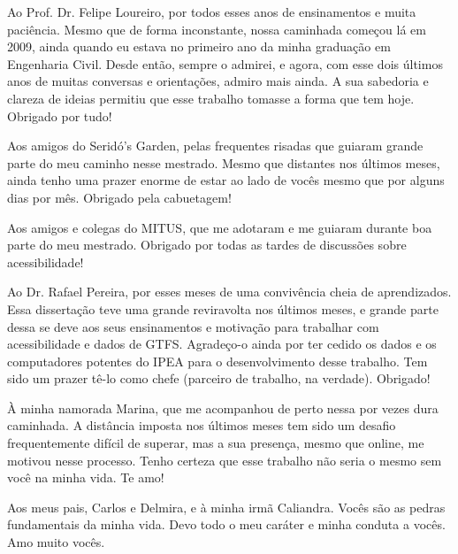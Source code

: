 
Ao Prof. Dr. Felipe Loureiro, por todos esses anos de ensinamentos e muita paciência. Mesmo que de forma inconstante, nossa caminhada começou lá em 2009, ainda quando eu estava no primeiro ano da minha graduação em Engenharia Civil. Desde então, sempre o admirei, e agora, com esse dois últimos anos de muitas conversas e orientações, admiro mais ainda. A sua sabedoria e clareza de ideias permitiu que esse trabalho tomasse a forma que tem hoje. Obrigado por tudo!

Aos amigos do Seridó's Garden, pelas frequentes risadas que guiaram grande parte do meu caminho nesse mestrado. Mesmo que distantes nos últimos meses, ainda tenho uma prazer enorme de estar ao lado de vocês mesmo que por alguns dias por mês. Obrigado pela cabuetagem!

Aos amigos e colegas do MITUS, que me adotaram e me guiaram durante boa parte do meu mestrado. Obrigado por todas as tardes de discussões sobre acessibilidade! 

Ao Dr. Rafael Pereira, por esses meses de uma convivência cheia de aprendizados. Essa dissertação teve uma grande reviravolta nos últimos meses, e grande parte dessa se deve aos seus ensinamentos e motivação para trabalhar com acessibilidade e dados de GTFS. Agradeço-o ainda por ter cedido os dados e os computadores potentes do IPEA para o desenvolvimento desse trabalho. Tem sido um prazer tê-lo como chefe (parceiro de trabalho, na verdade). Obrigado!

À minha namorada Marina, que me acompanhou de perto nessa por vezes dura caminhada. A distância imposta nos últimos meses tem sido um desafio frequentemente difícil de superar, mas a sua presença, mesmo que online, me motivou nesse processo. Tenho certeza que esse trabalho não seria o mesmo sem você na minha vida. Te amo! 

Aos meus pais, Carlos e Delmira, e à minha irmã Caliandra. Vocês são as pedras fundamentais da minha vida. Devo todo o meu caráter e minha conduta a vocês. Amo muito vocês. 



